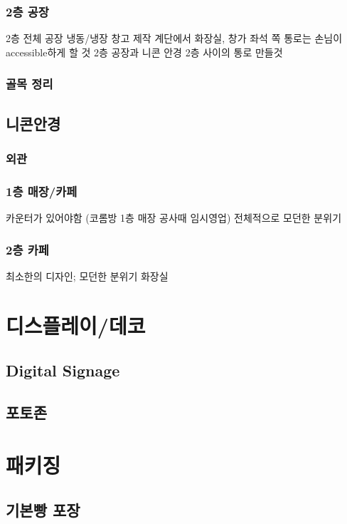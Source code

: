 \documentclass{myproc}
\begin{document}
\subsubsection{2층 공장}
\bit
\w 2층 전체 공장
\w 냉동/냉장 창고 제작
\w 계단에서 화장실, 창가 좌석 쪽 통로는 손님이 accessible하게 할 것
\w 2층 공장과 니콘 안경 2층 사이의  통로 만들것
\eit

\subsubsection{골목 정리}


\subsection{니콘안경}
\subsubsection{외관}

\subsubsection{1층 매장/카페}
\bit
\w 카운터가 있어야함 (코롬방 1층 매장 공사때 임시영업)
\w 전체적으로 모던한 분위기
\eit

\subsubsection{2층 카페}
\bit
\w 최소한의 디자인; 모던한 분위기
\w 화장실
\eit



\section{디스플레이/데코}
\subsection{Digital Signage}
\subsection{포토존}


\section{패키징}
\subsection{기본빵 포장}
\end{document}
